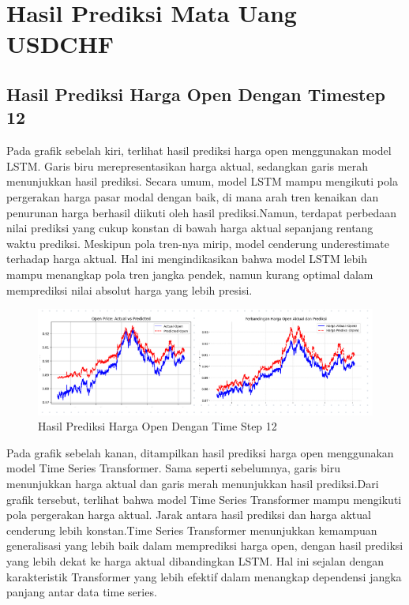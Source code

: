 \section{Hasil Prediksi Mata Uang USDCHF}
\subsection{Hasil Prediksi Harga Open Dengan Timestep 12}
Pada grafik sebelah kiri, terlihat hasil prediksi harga open menggunakan model LSTM. Garis biru merepresentasikan harga aktual, sedangkan garis merah menunjukkan hasil prediksi. Secara umum, model LSTM mampu mengikuti pola pergerakan harga pasar modal dengan baik, di mana arah tren kenaikan dan penurunan harga berhasil diikuti oleh hasil prediksi.Namun, terdapat perbedaan nilai prediksi yang cukup konstan di bawah harga aktual sepanjang rentang waktu prediksi. Meskipun pola tren-nya mirip, model cenderung underestimate terhadap harga aktual. Hal ini mengindikasikan bahwa model LSTM lebih mampu menangkap pola tren jangka pendek, namun kurang optimal dalam memprediksi nilai absolut harga yang lebih presisi.
\begin{figure} [H] \centering
    \includegraphics[scale=1.3]{gambar/perbandingan harga open(12).png} 
    \caption{Hasil Prediksi Harga Open Dengan Time Step 12}
    \label{fig:label_gambar}
\end{figure}
Pada grafik sebelah kanan, ditampilkan hasil prediksi harga open menggunakan model Time Series Transformer. Sama seperti sebelumnya, garis biru menunjukkan harga aktual dan garis merah menunjukkan hasil prediksi.Dari grafik tersebut, terlihat bahwa model Time Series Transformer mampu mengikuti pola pergerakan harga aktual. Jarak antara hasil prediksi dan harga aktual cenderung lebih konstan.Time Series Transformer menunjukkan kemampuan generalisasi yang lebih baik dalam memprediksi harga open, dengan hasil prediksi yang lebih dekat ke harga aktual dibandingkan LSTM. Hal ini sejalan dengan karakteristik Transformer yang lebih efektif dalam menangkap dependensi jangka panjang antar data time series.

